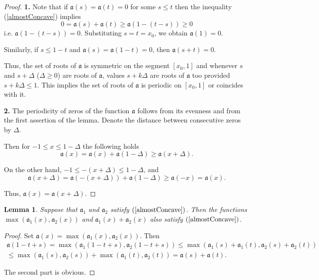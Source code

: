 \documentclass[12pt]{article}
\renewcommand{\ge}{\geqslant}
\renewcommand{\le}{\leqslant}
\newtheorem{lm}{Lemma}
\begin{document}
\begin{proof}
{\bf 1.}
Note that if $\mathfrak a(s) = \mathfrak a(t) = 0$ for some $s \le t$
then the inequality (\ref{almostConcave}) implies
$$0 = \mathfrak a(s) + \mathfrak a(t) \ge \mathfrak a( 1 - (t - s) ) \ge 0$$
i.e. $\mathfrak a(1 - (t - s)) = 0$.
Substituting $s = t = x_0$, we obtain $\mathfrak a(1) = 0$.

Similarly, if $s \le 1 - t$ and $\mathfrak a(s) = \mathfrak a(1 - t) = 0$, then $\mathfrak a(s + t) = 0$.

Thus, the set of roots of $\mathfrak a$ is symmetric on the segment $[x_0, 1]$ and
whenever $s$ and $s + \Delta$ ($\Delta \ge 0$) are roots of $\mathfrak a$,
values $s + k\Delta$ are roots of $\mathfrak a$ too provided $s + k\Delta \le 1$.
This implies the set of roots of $\mathfrak a$ is periodic on $[x_0, 1]$
or coincides with it.

{\bf 2.} The periodicity of zeros of the function $\mathfrak a$ follows from its evenness and from the first assertion of the lemma.
Denote the distance between consecutive zeros by $\Delta$.

Then for $-1 \le x \le 1 - \Delta$ the following holds
$$\mathfrak a(x) = \mathfrak a(x) + \mathfrak a(1 - \Delta) \ge \mathfrak a(x + \Delta).$$

On the other hand, $-1 \le -(x + \Delta) \le 1 - \Delta$, and
$$\mathfrak a(x + \Delta) = \mathfrak a(-(x + \Delta)) + \mathfrak a(1 - \Delta) \ge \mathfrak a(-x) = \mathfrak a(x).$$

Thus, $\mathfrak a(x) = \mathfrak a(x + \Delta)$.
\end{proof}

\begin{lm}
\label{maxSumConcave}
Suppose that $\mathfrak a_1$ and $\mathfrak a_2$ satisfy $(\ref{almostConcave})$.
Then the functions $\max (\mathfrak a_1(x), \mathfrak a_2(x))$ and $\mathfrak a_1(x) + \mathfrak a_2(x)$ also satisfy $(\ref{almostConcave})$.
\end{lm}
\begin{proof}
Set $\mathfrak a(x) = \max (\mathfrak a_1(x), \mathfrak a_2(x))$. Then
\begin{multline*}
\mathfrak a(1 - t + s) = \max(\mathfrak a_1( 1 - t + s), \mathfrak a_2(1 - t + s)) \le
\max(\mathfrak a_1(s) + \mathfrak a_1(t), \mathfrak a_2(s) + \mathfrak a_2(t)) \\
\le \max(\mathfrak a_1(s), \mathfrak a_2(s)) + \max(\mathfrak a_1(t), \mathfrak a_2(t)) =
\mathfrak a(s) + \mathfrak a(t).
\end{multline*}

The second part is obvious.
\end{proof}
\end{document}
